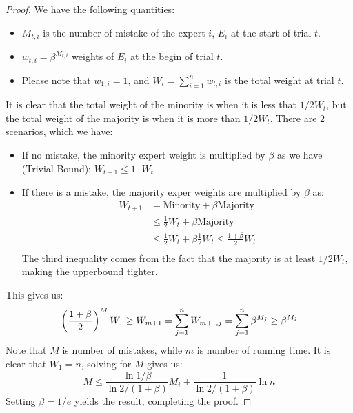 \begin{proof}
    We have the following quantities: 
    \begin{itemize}
        \item $M_{t, i}$ is the number of mistake of the expert $i$, $E_i$ at the start of trial $t$. 
        \item $w_{t, i}= \beta^{M_{t, i}}$ weights of $E_i$ at the begin of trial $t$. 
        \item Please note that $w_{1, i} = 1$, and $W_t = \sum^n_{i=1}w_{t, i}$ is the total weight at trial $t$. 
    \end{itemize}
    It is clear that the total weight of the minority is when it is less that $1/2 W_t$, but the total weight of the majority is when it is more than $1/2 W_t$. There are $2$ scenarios, which we have:
    \begin{itemize}
        \item If no mistake, the minority expert weight is multiplied by $\beta$ as we have (Trivial Bound): $W_{t+1} \le 1\cdot W_t$
        \item If there is a mistake, the majority exper weights are multiplied by $\beta$ as:
        \begin{equation*}
        \begin{aligned}
            W_{t+1} &= \text{Minority} + \beta\text{Majority} \\
            &\le \frac{1}{2}W_t + \beta\text{Majority} \\
            &\le \frac{1}{2}W_t + \beta\frac{1}{2}W_t \le \frac{1+\beta}{2}W_t \\
        \end{aligned}
        \end{equation*}
        The third inequality comes from the fact that the majority is at least $1/2W_t$, making the upperbound tighter.
    \end{itemize}
    This gives us:
    \begin{equation*}
        \left( \frac{1+\beta}{2} \right)^MW_1\ge W_{m+1} = \sum^n_{j=1}W_{m+1, j} = \sum^n_{j=1}\beta^{M_j} \ge \beta^{M_i}
    \end{equation*}
    Note that $M$ is number of mistakes, while $m$ is number of running time. It is clear that $W_1 = n$, solving for $M$ gives us:
    \begin{equation*}
        M \le \frac{\ln 1/\beta}{\ln 2/(1+\beta)}M_i + \frac{1}{\ln2/(1+\beta)}\ln n
    \end{equation*}
    Setting $\beta=1/e$ yields the result, completing the proof.
\end{proof}

